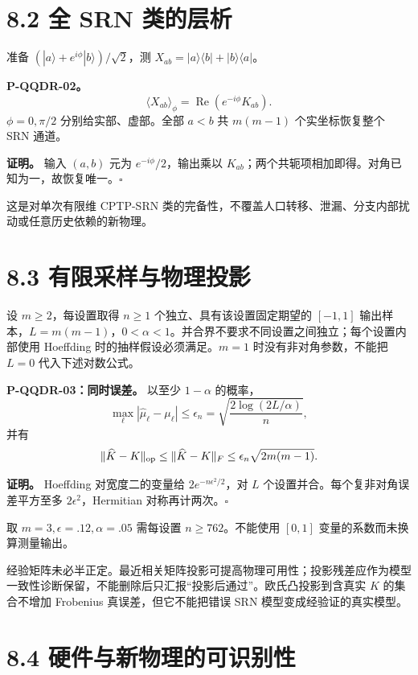 \documentclass[
  11pt,
  oneside]{book}
\begin{document}
\section{8.2 全 SRN 类的层析}

准备 \((|a\rangle+e^{i\phi}|b\rangle)/\sqrt2\)，测
\(X_{ab}=|a\rangle\langle b|+|b\rangle\langle a|\)。

\protect\hypertarget{p-qqdr-02}{}{}

\textbf{P-QQDR-02。} \[
\langle X_{ab}\rangle_\phi
=\operatorname{Re}(e^{-i\phi}K_{ab}).
\] \(\phi=0,\pi/2\) 分别给实部、虚部。全部 \(a<b\) 共 \(m(m-1)\)
个实坐标恢复整个 SRN 通道。

\textbf{证明。} 输入 \((a,b)\) 元为 \(e^{-i\phi}/2\)，输出乘以
\(K_{ab}\)；两个共轭项相加即得。对角已知为一，故恢复唯一。\(\square\)

这是对单次有限维 CPTP-SRN
类的完备性，不覆盖人口转移、泄漏、分支内部扰动或任意历史依赖的新物理。

\section{8.3 有限采样与物理投影}

设 \(m\ge2\)，每设置取得 \(n\ge1\) 个独立、具有该设置固定期望的
\([-1,1]\)
输出样本，\(L=m(m-1)\)，\(0<\alpha<1\)。并合界不要求不同设置之间独立；每个设置内部使用
Hoeffding 时的抽样假设必须满足。\(m=1\) 时没有非对角参数，不能把 \(L=0\)
代入下述对数公式。

\protect\hypertarget{p-qqdr-03}{}{}

\textbf{P-QQDR-03：同时误差。} 以至少 \(1-\alpha\) 的概率， \[
\max_\ell|\widehat\mu_\ell-\mu_\ell|
\le\epsilon_n=\sqrt{\frac{2\log(2L/\alpha)}n},
\] 并有 \[
\|\widehat K-K\|_{\rm op}\le\|\widehat K-K\|_F
\le\epsilon_n\sqrt{2m(m-1)}.
\]

\textbf{证明。} Hoeffding 对宽度二的变量给 \(2e^{-n\epsilon^2/2}\)，对
\(L\) 个设置并合。每个复非对角误差平方至多 \(2\epsilon^2\)，Hermitian
对称再计两次。\(\square\)

取 \(m=3,\epsilon=.12,\alpha=.05\) 需每设置 \(n\ge762\)。不能使用
\([0,1]\) 变量的系数而未换算测量输出。

经验矩阵未必半正定。最近相关矩阵投影可提高物理可用性；投影残差应作为模型一致性诊断保留，不能删除后只汇报``投影后通过''。欧氏凸投影到含真实
\(K\) 的集合不增加 Frobenius 真误差，但它不能把错误 SRN
模型变成经验证的真实模型。

\section{8.4 硬件与新物理的可识别性}
\end{document}
